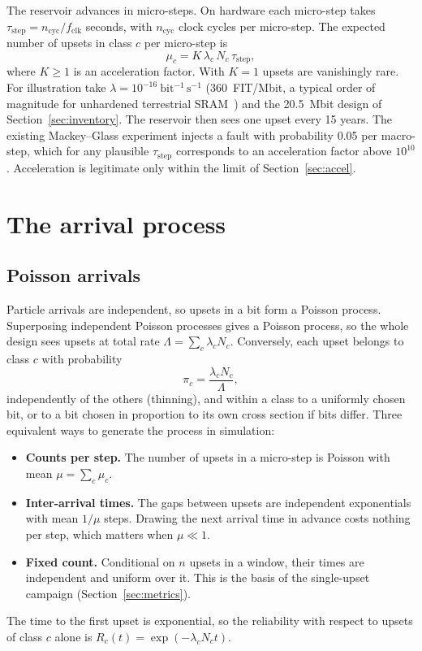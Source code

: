 \documentclass[11pt,a4paper]{article}
\begin{document}
The reservoir advances in micro-steps. On hardware each micro-step takes $\tau_{\mathrm{step}} = n_{\mathrm{cyc}}/f_{\mathrm{clk}}$ seconds, with $n_{\mathrm{cyc}}$ clock cycles per micro-step. The expected number of upsets in class $c$ per micro-step is
\begin{equation}
\mu_c = K \, \lambda_c \, N_c \, \tau_{\mathrm{step}},
\label{eq:mu}
\end{equation}
where $K \ge 1$ is an acceleration factor. With $K=1$ upsets are vanishingly rare. For illustration take $\lambda = 10^{-16}~\mathrm{bit^{-1}\,s^{-1}}$ (360~FIT/Mbit, a typical order of magnitude for unhardened terrestrial SRAM~\cite{baumann2005}) and the 20.5~Mbit design of Section~\ref{sec:inventory}. The reservoir then sees one upset every 15 years. The existing Mackey--Glass experiment injects a fault with probability 0.05 per macro-step, which for any plausible $\tau_{\mathrm{step}}$ corresponds to an acceleration factor above $10^{10}$. Acceleration is legitimate only within the limit of Section~\ref{sec:accel}.

\section{The arrival process}
\label{sec:arrivals}

\subsection{Poisson arrivals}

Particle arrivals are independent, so upsets in a bit form a Poisson process. Superposing independent Poisson processes gives a Poisson process, so the whole design sees upsets at total rate $\Lambda = \sum_c \lambda_c N_c$. Conversely, each upset belongs to class $c$ with probability
\begin{equation}
\pi_c = \frac{\lambda_c N_c}{\Lambda},
\label{eq:pic}
\end{equation}
independently of the others (thinning), and within a class to a uniformly chosen bit, or to a bit chosen in proportion to its own cross section if bits differ. Three equivalent ways to generate the process in simulation:
\begin{itemize}
  \item \textbf{Counts per step.} The number of upsets in a micro-step is Poisson with mean $\mu = \sum_c \mu_c$.
  \item \textbf{Inter-arrival times.} The gaps between upsets are independent exponentials with mean $1/\mu$ steps. Drawing the next arrival time in advance costs nothing per step, which matters when $\mu \ll 1$.
  \item \textbf{Fixed count.} Conditional on $n$ upsets in a window, their times are independent and uniform over it. This is the basis of the single-upset campaign (Section~\ref{sec:metrics}).
\end{itemize}
The time to the first upset is exponential, so the reliability with respect to upsets of class $c$ alone is $R_c(t) = \exp(-\lambda_c N_c t)$.
\end{document}
